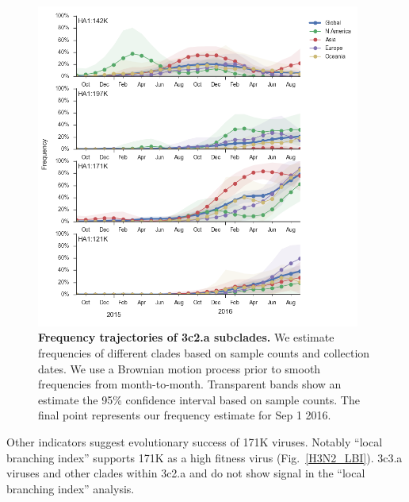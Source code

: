 \documentclass[11pt,oneside,letterpaper]{article}
\begin{document}
\begin{figure}[H]
	\centering
	\includegraphics[width=0.95\textwidth]{../figures/sep-2016/H3N2_mutations.png}
	\caption{\textbf{Frequency trajectories of 3c2.a subclades.}
	We estimate frequencies of different clades based on sample counts and collection dates.
	We use a Brownian motion process prior to smooth frequencies from month-to-month.
	Transparent bands show an estimate the 95\% confidence interval based on sample counts.
	The final point represents our frequency estimate for Sep 1 2016.
	}
	\label{H3N2_mutations}
\end{figure}

\pagebreak

Other indicators suggest evolutionary success of 171K viruses. Notably ``local branching index'' \cite{neher2014predicting} supports 171K as a high fitness virus (Fig.\ \ref{H3N2_LBI}). 3c3.a viruses and other clades within 3c2.a and do not show signal in the ``local branching index'' analysis.
\end{document}
